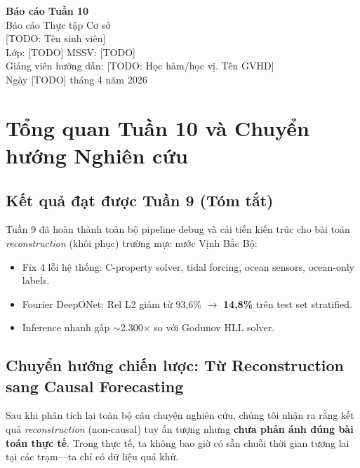 \documentclass[12pt,a4paper]{article}
\begin{document}
\begin{center}
  {\LARGE\bfseries Báo cáo Tuần 10}\\[4pt]
  {\large Báo cáo Thực tập Cơ sở}\\[12pt]
  [TODO: Tên sinh viên]\\
  Lớp: [TODO] \quad MSSV: [TODO]\\
  Giảng viên hướng dẫn: [TODO: Học hàm/học vị. Tên GVHD]\\[4pt]
  Ngày [TODO] tháng 4 năm 2026
\end{center}

\vspace{1em}

\section{Tổng quan Tuần 10 và Chuyển hướng Nghiên cứu}

\subsection{Kết quả đạt được Tuần 9 (Tóm tắt)}

Tuần 9 đã hoàn thành toàn bộ pipeline debug và cải tiến kiến trúc cho bài toán \emph{reconstruction} (khôi phục) trường mực nước Vịnh Bắc Bộ:

\begin{itemize}[nosep]
  \item Fix 4 lỗi hệ thống: C-property solver, tidal forcing, ocean sensors, ocean-only labels.
  \item Fourier DeepONet: Rel L2 giảm từ 93,6\% $\to$ \textbf{14,8\%} trên test set stratified.
  \item Inference nhanh gấp $\sim$2.300$\times$ so với Godunov HLL solver.
\end{itemize}

\subsection{Chuyển hướng chiến lược: Từ Reconstruction sang Causal Forecasting}

Sau khi phân tích lại toàn bộ câu chuyện nghiên cứu, chúng tôi nhận ra rằng kết quả \emph{reconstruction} (non-causal) tuy ấn tượng nhưng \textbf{chưa phản ánh đúng bài toán thực tế}. Trong thực tế, ta không bao giờ có sẵn chuỗi thời gian tương lai tại các trạm---ta chỉ có dữ liệu quá khứ.
\end{document}
